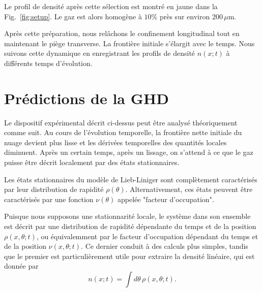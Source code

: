 Le profil de densité après cette sélection est montré en jaune dans la Fig.~\ref{fig:setup}. Le gaz est alors homogène à $10\%$ près sur environ $200\,\mu$m.

Après cette préparation, nous relâchons le confinement longitudinal tout en maintenant le piège transverse. La frontière initiale s’élargit avec le temps. Nous suivons cette dynamique en enregistrant les profils de densité $n(x;t)$ à différents temps d’évolution.

\section{Prédictions de la GHD}\label{sec.GHDpredictions}
\label{sec:ghd}

Le dispositif expérimental décrit ci-dessus peut être analysé théoriquement comme suit. Au cours de l'évolution temporelle, la frontière nette initiale du nuage devient plus lisse et les dérivées temporelles des quantités locales diminuent. Après un certain temps, après un lissage, on s'attend à ce que le gaz puisse être décrit localement par des états stationnaires.

Les états stationnaires du modèle de Lieb-Liniger sont complètement caractérisés par leur distribution de rapidité $\rho(\theta)$. Alternativement, ces états peuvent être caractérisés par une fonction $\nu(\theta)$ appelée "facteur d'occupation".%

Puisque nous supposons une stationnarité locale, le système dans son ensemble est décrit par une distribution de rapidité dépendante du temps et de la position $\rho(x,\theta ; t )$, ou équivalemment par le facteur d'occupation dépendant du temps et de la position $\nu(x,\theta ; t)$. Ce dernier conduit à des calculs plus simples, tandis que le premier est particulièrement utile pour extraire la densité linéaire, qui est donnée par
\begin{equation}
    \label{eq:lineardensity}
	n(x;t) = \int d\theta \, \rho(x,\theta ; t ) .
\end{equation}

